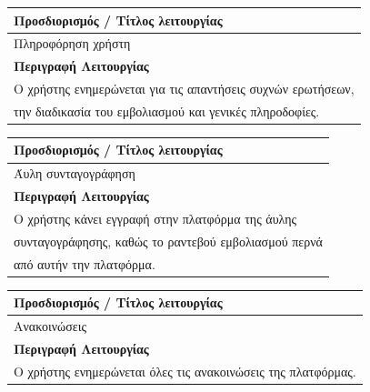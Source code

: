 \documentclass[12pt]{turabian-researchpaper}
\begin{document}
\begin{center}
    \begin{table}
        \centering
        \begin{tabular}{|l|}
            \hline
            \textbf{Προσδιορισμός / Τίτλος λειτουργίας}                 \\ \hline
            Πληροφόρηση χρήστη                                          \\ \hline
            \textbf{Περιγραφή Λειτουργίας}                              \\ \hline
            Ο χρήστης ενημερώνεται για τις απαντήσεις συχνών ερωτήσεων, \\
            την διαδικασία του εμβολιασμού και γενικές πληροδοφίες.     \\ \hline
        \end{tabular}
    \end{table}

    \begin{table}
        \centering
        \begin{tabular}{|l|}
            \hline
            \textbf{Προσδιορισμός / Τίτλος λειτουργίας}          \\ \hline
            Άυλη συνταγογράφηση                                  \\ \hline
            \textbf{Περιγραφή Λειτουργίας}                       \\ \hline
            Ο χρήστης κάνει εγγραφή στην πλατφόρμα της άυλης     \\
            συνταγογράφησης, καθώς το ραντεβού εμβολιασμού περνά \\
            από αυτήν την πλατφόρμα.                             \\ \hline
        \end{tabular}
    \end{table}

    \begin{table}
        \centering
        \begin{tabular}{|l|}
            \hline
            \textbf{Προσδιορισμός / Τίτλος λειτουργίας}                  \\ \hline
            Ανακοινώσεις                                                 \\ \hline
            \textbf{Περιγραφή Λειτουργίας}                               \\ \hline
            Ο χρήστης ενημερώνεται όλες τις ανακοινώσεις της πλατφόρμας. \\ \hline
        \end{tabular}
    \end{table}

\end{center}
\end{document}
